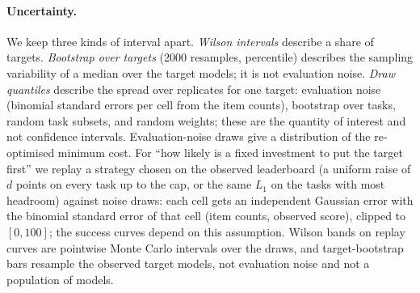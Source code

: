 \paragraph{Uncertainty.}
We keep three kinds of interval apart. \emph{Wilson intervals} describe a share of targets. \emph{Bootstrap over targets} (2000 resamples, percentile) describes the sampling variability of a median over the target models; it is not evaluation noise. \emph{Draw quantiles} describe the spread over replicates for one target: evaluation noise (binomial standard errors per cell from the item counts), bootstrap over tasks, random task subsets, and random weights; these are the quantity of interest and not confidence intervals.
Evaluation-noise draws give a distribution of the re-optimised minimum cost. For ``how likely is a fixed investment to put the target first'' we replay a strategy chosen on the observed leaderboard (a uniform raise of $d$ points on every task up to the cap, or the same $L_1$ on the tasks with most headroom) against noise draws: each cell gets an independent Gaussian error with the binomial standard error of that cell (item counts, observed score), clipped to $[0,100]$; the success curves depend on this assumption. Wilson bands on replay curves are pointwise Monte Carlo intervals over the draws, and target-bootstrap bars resample the observed target models, not evaluation noise and not a population of models.
